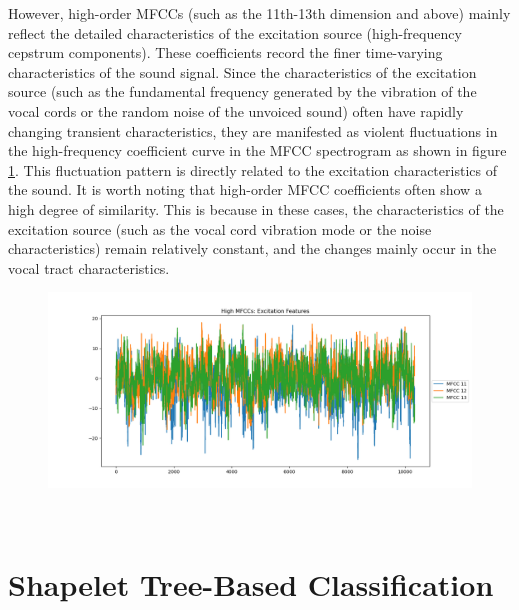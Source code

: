However, high-order MFCCs (such as the 11th-13th dimension and above) mainly reflect the detailed characteristics of the excitation source (high-frequency cepstrum components). These coefficients record the finer time-varying characteristics of the sound signal. Since the characteristics of the excitation source (such as the fundamental frequency generated by the vibration of the vocal cords or the random noise of the unvoiced sound) often have rapidly changing transient characteristics, they are manifested as violent fluctuations in the high-frequency coefficient curve in the MFCC spectrogram as shown in figure \ref{fig:High MFCCs}. This fluctuation pattern is directly related to the excitation characteristics of the sound. It is worth noting that high-order MFCC coefficients often show a high degree of similarity. This is because in these cases, the characteristics of the excitation source (such as the vocal cord vibration mode or the noise characteristics) remain relatively constant, and the changes mainly occur in the vocal tract characteristics.\\
\begin{figure}[h!]
	\centering
	\includegraphics[width=0.9\linewidth]{../Statistical_Sciences_template/figure/High MFCCs.png}
	\caption{}
	\label{fig:High MFCCs}
\end{figure}\\

\section{Shapelet Tree-Based Classification}

